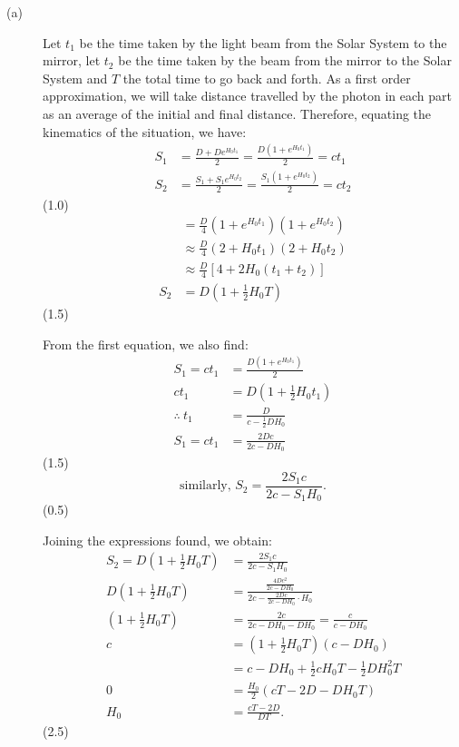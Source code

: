 \begin{description}
\item[(a)] Let $t_1$ be the time taken by the light beam from the Solar
  System to the mirror, let $t_2$ be the time taken by the beam from the
  mirror to the Solar System and $T$ the total time to go back and forth.
  As a first order approximation, we will take distance travelled by the
  photon in each part as an average of the initial and final distance.
  Therefore, equating the kinematics of the situation, we have:
  \begin{align*}
  S_1 &= \frac{D + De^{H_0 t_1}}{2}
       = \frac{D\left(1 + e^{H_0 t_1}\right)}{2} = ct_1\\
  S_2 &= \frac{S_1 + S_1 e^{H_0 t_2}}{2}
       = \frac{S_1\left(1 + e^{H_0 t_2}\right)}{2} = ct_2
  \end{align*}
  \hfill(1.0)
  \begin{align*}
  &= \frac{D}{4}\left(1 + e^{H_0 t_1}\right)\left(1 + e^{H_0 t_2}\right)\\
  &\approx \frac{D}{4}\left(2 + H_0 t_1\right)\left(2 + H_0 t_2\right)\\
  &\approx \frac{D}{4}\left[4 + 2H_0\left(t_1 + t_2\right)\right]\\
  S_2 &= D\left(1 + \frac{1}{2}H_0 T\right)
  \end{align*}
  \hfill(1.5)

  From the first equation, we also find:
  \begin{align*}
  S_1 = ct_1 &= \frac{D\left(1 + e^{H_0 t_1}\right)}{2}\\
  ct_1 &= D\left(1 + \frac{1}{2}H_0 t_1\right)\\
  \therefore\ t_1 &= \frac{D}{c - \frac{1}{2}DH_0}\\
  S_1 = ct_1 &= \frac{2Dc}{2c - DH_0}
  \end{align*}
  \hfill(1.5)
  \[ \text{similarly, } S_2 = \frac{2S_1 c}{2c - S_1 H_0}. \]
  \hfill(0.5)

  Joining the expressions found, we obtain:
  \begin{align*}
  S_2 = D\left(1 + \frac{1}{2}H_0 T\right)
    &= \frac{2S_1 c}{2c - S_1 H_0}\\
  D\left(1 + \frac{1}{2}H_0 T\right)
    &= \frac{\frac{4Dc^2}{2c - DH_0}}
            {2c - \frac{2Dc}{2c - DH_0}\cdot H_0}\\
  \left(1 + \frac{1}{2}H_0 T\right)
    &= \frac{2c}{2c - DH_0 - DH_0} = \frac{c}{c - DH_0}\\
  c &= \left(1 + \frac{1}{2}H_0 T\right)(c - DH_0)\\
    &= c - DH_0 + \frac{1}{2}cH_0 T - \frac{1}{2}DH_0^2 T\\
  0 &= \frac{H_0}{2}\left(cT - 2D - DH_0 T\right)\\
  H_0 &= \frac{cT - 2D}{DT}.
  \end{align*}
  \hfill(2.5)


\end{description}
